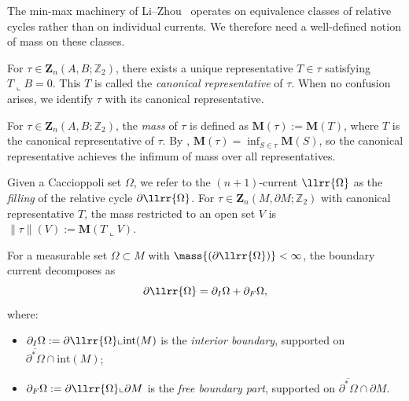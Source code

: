 The min-max machinery of Li--Zhou~\cite{LZ17} operates on equivalence classes of relative cycles rather than on individual currents. We therefore need a well-defined notion of mass on these classes.

\begin{definition}\label{def:canonical-rep}
For $\tau \in \mathbf{Z}_n(A, B;\mathbb{Z}_2)$, there exists a unique representative $T \in \tau$ satisfying $T \llcorner B = 0$. This $T$ is called the \emph{canonical representative} of $\tau$. When no confusion arises, we identify $\tau$ with its canonical representative.
\end{definition}

\begin{definition}\label{def:mass-equivalence-class}
For $\tau \in \mathbf{Z}_n(A, B;\mathbb{Z}_2)$, the \emph{mass} of $\tau$ is defined as $\mathbf{M}(\tau) := \mathbf{M}(T)$, where $T$ is the canonical representative of $\tau$. By \cite[Lemma~3.3]{LZ17}, $\mathbf{M}(\tau) = \inf_{S \in \tau} \mathbf{M}(S)$, so the canonical representative achieves the infimum of mass over all representatives.
\end{definition}

Given a Caccioppoli set $\Omega$, we refer to the $(n{+}1)$-current $\llrr{\Omega}$ as the \emph{filling} of the relative cycle $\partial\llrr{\Omega}$. For $\tau \in \mathbf{Z}_n(M, \partial M;\mathbb{Z}_2)$ with canonical representative $T$, the mass restricted to an open set $V$ is $\|\tau\|(V) := \mathbf{M}(T \llcorner V)$.

\begin{definition}\label{def:boundary-decomposition}
For a measurable set $\Omega \subset M$ with $\mass{(\partial\llrr{\Omega})} < \infty$, the boundary current decomposes as
\[
\partial \llrr{\Omega} = \partial_I \Omega + \partial_F \Omega,
\]
where:
\begin{itemize}
    \item $\partial_I \Omega := \partial \llrr{\Omega} \llcorner \mathrm{int}(M)$ is the \emph{interior boundary}, supported on $\overline{\partial^*\Omega} \cap \mathrm{int}(M)$;
    \item $\partial_F \Omega := \partial \llrr{\Omega} \llcorner \partial M$ is the \emph{free boundary part}, supported on $\overline{\partial^*\Omega} \cap \partial M$.
\end{itemize}
\end{definition}

